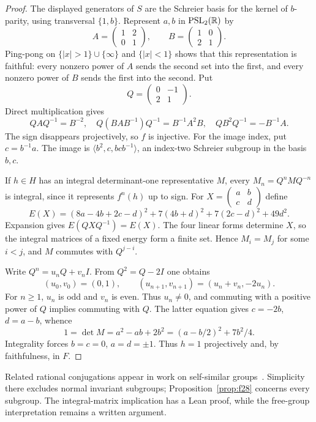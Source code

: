 \begin{proof}
The displayed generators of $S$ are the Schreier basis for the kernel
of $b$-parity, using transversal $\{1,b\}$. Represent $a,b$ in
$\mathrm{PSL}_2(\mathbb R)$ by
\[
 A=\begin{pmatrix}1&2\\0&1\end{pmatrix},\qquad
 B=\begin{pmatrix}1&0\\2&1\end{pmatrix}.
\]
Ping-pong on $\{|x|>1\}\cup\{\infty\}$ and $\{|x|<1\}$ shows
that this representation is faithful: every nonzero power of $A$
sends the second set into the first, and every nonzero power of $B$
sends the first into the second. Put
\[
 Q=\begin{pmatrix}0&-1\\2&1\end{pmatrix}.
\]
Direct multiplication gives
\[
 QAQ^{-1}=B^{-2},\quad Q(BAB^{-1})Q^{-1}=B^{-1}A^2B,
 \quad QB^2Q^{-1}=-B^{-1}A.
\]
The sign disappears projectively, so $f$ is injective. For the image
index, put $c=b^{-1}a$. The image is
$\langle b^2,c,bcb^{-1}\rangle$, an index-two Schreier subgroup
in the basis $b,c$.

If $h\in H$ has an integral determinant-one representative $M$, every
$M_n=Q^nMQ^{-n}$ is integral, since it represents $f^n(h)$ up to sign.
For $X=\left(\begin{smallmatrix}a&b\\c&d\end{smallmatrix}\right)$ define
\[
 E(X)=(8a-4b+2c-d)^2+7(4b+d)^2+7(2c-d)^2+49d^2.
\]
Expansion gives $E(QXQ^{-1})=E(X)$. The four linear forms determine
$X$, so the integral matrices of a fixed energy form a finite set.
Hence $M_i=M_j$ for some $i<j$, and $M$ commutes with $Q^{j-i}$.

Write $Q^n=u_nQ+v_nI$. From $Q^2=Q-2I$ one obtains
\[
 (u_0,v_0)=(0,1),\qquad (u_{n+1},v_{n+1})=(u_n+v_n,-2u_n).
\]
For $n\ge1$, $u_n$ is odd and $v_n$ is even. Thus $u_n\ne0$,
and commuting with a positive power of $Q$ implies commuting with $Q$.
The latter equation gives $c=-2b$, $d=a-b$, whence
\[
 1=\det M=a^2-ab+2b^2=(a-b/2)^2+7b^2/4.
\]
Integrality forces $b=c=0$, $a=d=\pm1$. Thus $h=1$ projectively
and, by faithfulness, in $F$.
\end{proof}

Related rational conjugations appear in work on self-similar
groups~\cite{kapovich-selfsimilar}. Simplicity there excludes
normal invariant subgroups; Proposition~\ref{prop:f28} concerns every
subgroup. The integral-matrix implication has a Lean proof, while the
free-group interpretation remains a written argument.

